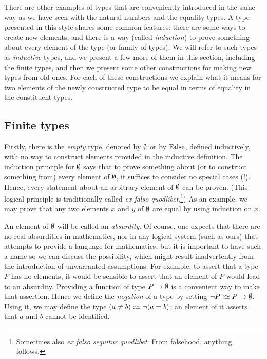 There are other examples of types that are conveniently introduced
in the same way as we have seen with the natural numbers and the equality types.
A type
presented in this style shares some common features: there are some ways to create new elements, and there is a way (called \emph{induction}) to
prove something about every element of the type (or family of types).  We will refer to such types as \emph{inductive} types, and we present a
few more of them in this section, including the finite types, and then we present some other constructions for making new types from old ones.
For each of these constructions we explain what it means for two elements of the newly constructed type to be equal in terms of equality in the
constituent types.

\subsection{Finite types}
\label{sec:finite-types}
Firstly, there is the \emph{empty} type, denoted by $\emptyset$ or by $\mathrm{False}$, defined inductively, with no way to construct elements provided in the inductive
definition.  The induction principle for $\emptyset$ says that to prove something about (or to construct something from) every element of
$\emptyset$, it suffices to consider no special cases (!).  Hence, every statement about an arbitrary element of $\emptyset$ can be proven. (This logical principle is traditionally called \emph{ex falso quodlibet}.\footnote{%
  Sometimes also \emph{ex falso sequitur quodlibet}:
  From falsehood, anything follows.}) As
an example, we may prove that any two elements $x$ and $y$ of $\emptyset$ are equal by using induction on $x$.

An element of $\emptyset$ will be called an \emph{absurdity}.  Of course, one expects that there are no real absurdities in mathematics, nor in any
logical system (such as ours) that attempts to provide a language for mathematics, but it is important to have such a name so we can discuss
the possibility, which might result inadvertently from the introduction of unwarranted assumptions.  For example, to assert that a type $P$ has
no elements, it would be sensible to assert that an element of $P$ would lead to an absurdity.  Providing a function of type $P \to \emptyset$ is a
convenient way to make that assertion.  Hence we define the \emph{negation} of a type by setting $\neg P \defeq P \to \emptytype$.  Using it, we
may define the type $(a \ne b) \defeq \neg (a = b)$; an element of it asserts that $a$ and $b$ cannot be identified.


